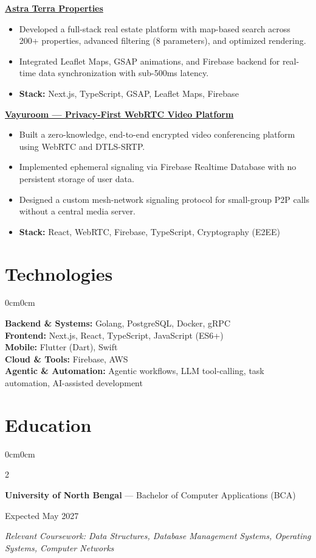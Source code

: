 \documentclass[10pt, letterpaper]{article}
\newenvironment{highlights}{
    \begin{itemize}[
        topsep=1pt,
        itemsep=0.5pt,
        parsep=0pt,
        partopsep=0pt,
        leftmargin=11pt
    ]
}{
    \end{itemize}
}
\newenvironment{onecolentry}{
    \begin{adjustwidth}{0cm}{0cm}
}{
    \end{adjustwidth}
}
\newenvironment{twocolentry}[2]{
    \onecolentry
    \setcolumnwidth{\fill,4.1cm}
    \begin{paracol}{2}
    #1
    \switchcolumn
    \raggedleft #2
}{
    \end{paracol}
    \endonecolentry
}
\begin{document}
\href{https://www.astraterra.ae/}{\textbf{Astra Terra Properties}} \\
\begin{highlights}
\item Developed a full-stack real estate platform with map-based search across 200+ properties, advanced filtering (8 parameters), and optimized rendering.
\item Integrated Leaflet Maps, GSAP animations, and Firebase backend for real-time data synchronization with sub-500ms latency.
\item \textbf{Stack:} Next.js, TypeScript, GSAP, Leaflet Maps, Firebase
\end{highlights}

\href{https://vayuroom.vercel.app/}{\textbf{Vayuroom — Privacy-First WebRTC Video Platform}}  
\begin{highlights}
\item Built a zero-knowledge, end-to-end encrypted video conferencing platform using WebRTC and DTLS-SRTP.
\item Implemented ephemeral signaling via Firebase Realtime Database with no persistent storage of user data.
\item Designed a custom mesh-network signaling protocol for small-group P2P calls without a central media server.
\item \textbf{Stack:} React, WebRTC, Firebase, TypeScript, Cryptography (E2EE)
\end{highlights}

\section{Technologies}
\begin{onecolentry}
\textbf{Backend \& Systems:} Golang, PostgreSQL, Docker, gRPC \\
\textbf{Frontend:} Next.js, React, TypeScript, JavaScript (ES6+) \\
\textbf{Mobile:} Flutter (Dart), Swift \\
\textbf{Cloud \& Tools:} Firebase, AWS \\
\textbf{Agentic \& Automation:} Agentic workflows, LLM tool-calling, task automation, AI-assisted development
\end{onecolentry}

\section{Education}

\begin{twocolentry}{
\textbf{University of North Bengal} --- Bachelor of Computer Applications (BCA)
}{
Expected May 2027
}
\end{twocolentry}

{\small\textit{Relevant Coursework: Data Structures, Database Management Systems, Operating Systems, Computer Networks}}
\end{document}

